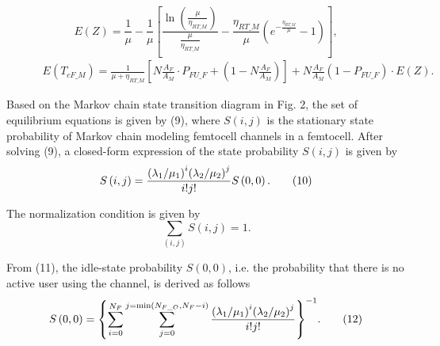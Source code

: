 \documentclass[10pt,final,journal,letterpaper,twoside,twocolumn]{IEEEtran}
\begin{document}
\begin{figure*}[!t]
\begin{equation}
\begin{split}
\end{split}
\label{eq22}
\tag{16a}
\end{equation}
\begin{equation}
E\left( Z \right) = \frac{1}{\mu } - \frac{1}{\mu }\left[ {\frac{{\ln \left( {\frac{\mu }{{{\eta _{RT\_M}}}}} \right)}}{{\frac{\mu }{{{\eta _{RT\_M}}}}}} - \frac{{{\eta _{RT\_M}}}}{\mu }\left( {{e^{ - \frac{{{\eta _{RT\_M}}}}{\mu }}} - 1} \right)} \right] ,
\label{eq23}
\tag{16b}
\end{equation}
\begin{equation}
\begin{split}
E\left( {T_{cF\_M}} \right) = \frac{1}{{\mu  + {\eta _{RT\_M}}}}\left[ {N\frac{{{A_F}}}{{{A_M}}} \cdot {P_{FU\_F}} + \left( {1 - N\frac{{{A_F}}}{{{A_M}}}} \right)} \right]+N\frac{{{A_F}}}{{{A_M}}}\left( {1 - {P_{FU\_F}}} \right) \cdot E\left( Z \right).
\end{split}
\label{eq25}
\tag{18}
\end{equation}
\end{figure*}

Based on the Markov chain state transition diagram in Fig. 2, the set of equilibrium
equations is given by (9), where $S\left( {i,j} \right)$ is the stationary state probability of Markov chain modeling femtocell channels in a femtocell. After
solving (9), a closed-form expression of the state probability $S\left( {i,j}
\right)$ is given by
\begin{equation}
S\left( {i,j} \right) = \frac{{{{\left( {{{{\lambda _1}} \mathord{\left/ {\vphantom {{{\lambda _1}} {{\mu _1}}}} \right. \kern-\nulldelimiterspace} {{\mu _1}}}} \right)}^i}{{\left( {{{{\lambda _2}} \mathord{\left/ {\vphantom {{{\lambda _2}} {{\mu _2}}}} \right. \kern-\nulldelimiterspace} {{\mu _2}}}} \right)}^j}}}{{i!j!}}S\left( {0,0} \right).
\label{eq16}
\tag{10}
\end{equation}

The normalization condition is given by
\begin{equation}
\sum\limits_{\left( {i,j} \right)} {S\left( {i,j} \right) = 1}.
\label{eq17}
\tag{11}
\end{equation}

From (11), the idle-state probability $S\left( {0,0} \right)$, i.e. the probability that there is no active user using the channel, is derived as follows
\begin{equation}
S\left( {0,0} \right) = {\left\{ {\sum\limits_{i = 0}^{{N_F}} {\sum\limits_{j = 0}^{j = \min \left( {{N_{F\_O}},{N_F} - i} \right)} {\frac{{{{\left( {{{{\lambda _1}} \mathord{\left/ {\vphantom {{{\lambda _1}} {{\mu _1}}}} \right. \kern-\nulldelimiterspace} {{\mu _1}}}} \right)}^i}{{\left( {{{{\lambda _2}} \mathord{\left/ {\vphantom {{{\lambda _2}} {{\mu _2}}}} \right. \kern-\nulldelimiterspace} {{\mu _2}}}} \right)}^j}}}{{i!j!}}} } } \right\}^{ - 1}}.
\label{eq18}
\tag{12}
\end{equation}
\end{document}
